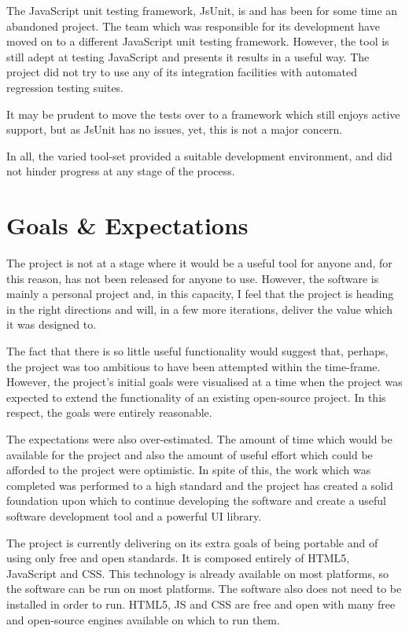 The JavaScript unit testing framework, JsUnit, is and has been for some time an abandoned project. The team which was responsible for its development have moved on to a different JavaScript unit testing framework. However, the tool is still adept at testing JavaScript and presents it results in a useful way. The project did not try to use any of its integration facilities with automated regression testing suites.

It may be prudent to move the tests over to a framework which still enjoys active support, but as JsUnit has no issues, yet, this is not a major concern.

In all, the varied tool-set provided a suitable development environment, and did not hinder progress at any stage of the process.

\section{Goals \& Expectations}
The project is not at a stage where it would be a useful tool for anyone and, for this reason, has not been released for anyone to use. However, the software is mainly a personal project and, in this capacity, I feel that the project is heading in the right directions and will, in a few more iterations, deliver the value which it was designed to.

The fact that there is so little useful functionality would suggest that, perhaps, the project was too ambitious to have been attempted within the time-frame. However, the project's initial goals were visualised at a time when the project was expected to extend the functionality of an existing open-source project. In this respect, the goals were entirely reasonable.

The expectations were also over-estimated. The amount of time which would be available for the project and also the amount of useful effort which could be afforded to the project were optimistic. In spite of this, the work which was completed was performed to a high standard and the project has created a solid foundation upon which to continue developing the software and create a useful software development tool and a powerful UI library.

The project is currently delivering on its extra goals of being portable and of using only free and open standards. It is composed entirely of HTML5, Java\-Script and CSS. This technology is already available on most platforms, so the software can be run on most platforms. The software also does not need to be installed in order to run. HTML5, JS and CSS are free and open with many free and open-source engines available on which to run them.

